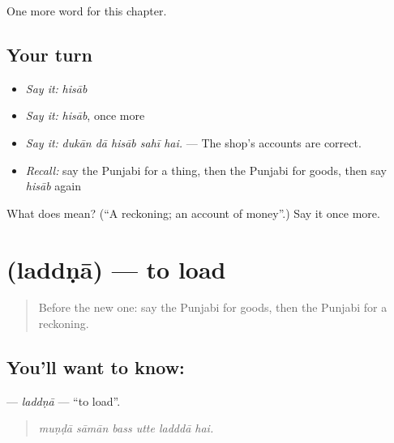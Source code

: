 \begin{grammarlens}[title={What you've built}]
One more word for this chapter.
\end{grammarlens}

\subsection*{Your turn}
\begin{itemize}
\raggedright
  \item \emph{Say it:} \emph{hisāb}
  \item \emph{Say it:} \emph{hisāb}, once more
  \item \emph{Say it:} \emph{dukān dā hisāb sahī hai.} — The shop's accounts are correct.
  \item \emph{Recall:} say the Punjabi for a thing, then the Punjabi for goods, then say \emph{hisāb} again
\end{itemize}

\begin{tcolorbox}[breakable,colback=teal!4,colframe=teal!35!black,title={Before you move on}]
What does  mean? (\textquotedblleft{}A reckoning; an account of money\textquotedblright{}.) Say it once more.
\end{tcolorbox}
\section[\texorpdfstring{\pa{ਲੱਦਣਾ} (laddṇā)}{ਲੱਦਣਾ (laddṇā)}]{ (laddṇā) — to load}

\label{lesson:PA-C278-laddna}



\begin{quote}
Before the new one: say the Punjabi for goods, then the Punjabi for a reckoning.
\end{quote}

\subsection*{You'll want to know: }
\textbf{} — \emph{laddṇā} — \textquotedblleft{}to load\textquotedblright{}.

\begin{quote}
     
\end{quote}

\begin{quote}
\emph{muṇḍā sāmān bass utte ladddā hai.}
\end{quote}

